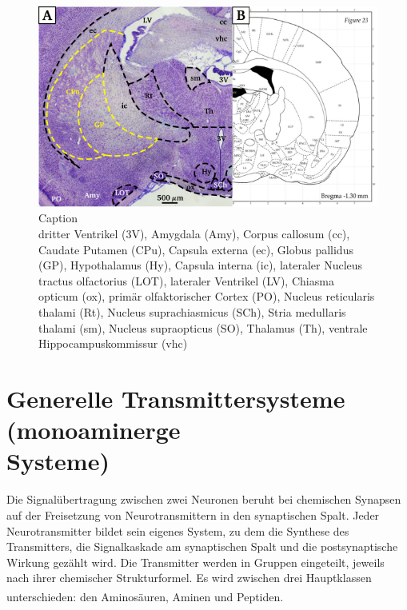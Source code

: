 \documentclass[12pt,a4paper,pdftex]{article}
\begin{document}
\begin{figure}[H]
    \centering
    \includegraphics{pictures/Basalganglia/GP_CPu.png}
    \caption{Caption\\
    dritter Ventrikel (3V), Amygdala (Amy), Corpus callosum (cc), Caudate Putamen (CPu), Capsula externa (ec), Globus pallidus (GP), Hypothalamus (Hy), Capsula interna (ic), lateraler Nucleus tractus olfactorius (LOT), lateraler Ventrikel (LV), Chiasma opticum (ox), primär olfaktorischer Cortex (PO),  Nucleus reticularis thalami (Rt), Nucleus suprachiasmicus (SCh), Stria medullaris thalami (sm), Nucleus supraopticus (SO), Thalamus (Th), ventrale Hippocampuskommissur (vhc)}
    \label{fig:GP_CPu}
\end{figure}

\newpage
\section[Generelle Transmittersysteme (monoaminerge Systeme)]{Generelle Transmittersysteme (monoaminerge \\Systeme)}
\label{sec:transmittersysteme}

Die Signalübertragung zwischen zwei Neuronen beruht bei chemischen Synapsen auf der Freisetzung von Neurotransmittern in den synaptischen Spalt. Jeder Neurotransmitter bildet sein eigenes System, zu dem die Synthese des Transmitters, die Signalkaskade am synaptischen Spalt und die postsynaptische Wirkung gezählt wird. 
Die Transmitter werden in Gruppen eingeteilt, jeweils nach ihrer chemischer Strukturformel. Es wird zwischen drei Hauptklassen unterschieden: den Aminosäuren, Aminen und Peptiden. \textsuperscript{\cite[6]{neurowissenschaften_baer}}
\end{document}
